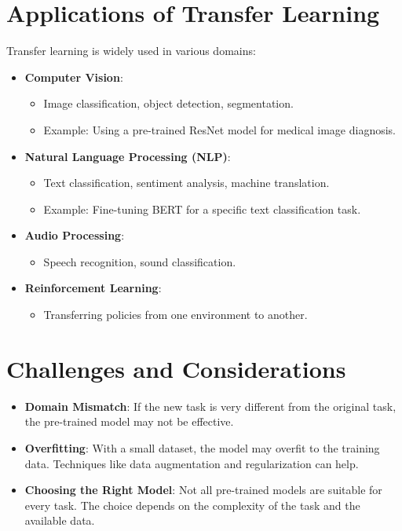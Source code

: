 \begin{notechapter}
\section{Applications of Transfer Learning}
Transfer learning is widely used in various domains:
\begin{itemize}
    \item \textbf{Computer Vision}:
          \begin{itemize}
              \item Image classification, object detection, segmentation.
              \item Example: Using a pre-trained ResNet model for medical
                    image diagnosis.
          \end{itemize}
    \item \textbf{Natural Language Processing (NLP)}:
          \begin{itemize}
              \item Text classification, sentiment analysis, machine translation.
              \item Example: Fine-tuning BERT for a specific text classification task.
          \end{itemize}
    \item \textbf{Audio Processing}:
          \begin{itemize}
              \item Speech recognition, sound classification.
          \end{itemize}
    \item \textbf{Reinforcement Learning}:
          \begin{itemize}
              \item Transferring policies from one environment to another.
          \end{itemize}
\end{itemize}

\section{Challenges and Considerations}
\begin{itemize}
    \item \textbf{Domain Mismatch}: If the new task is very different from
          the original task, the pre-trained model may not be effective.
    \item \textbf{Overfitting}: With a small dataset, the model may overfit
          to the training data. Techniques like data augmentation and
          regularization can help.
    \item \textbf{Choosing the Right Model}: Not all pre-trained models are
          suitable for every task. The choice depends on the complexity of
          the task and the available data.
\end{itemize}


\end{notechapter}

